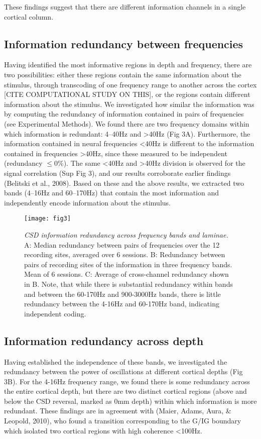 These findings suggest that there are different information channels in a single cortical column.

\subsection{Information redundancy between frequencies}
Having identified the most informative regions in depth and frequency, there are two possibilities: either these regions contain the same information about the stimulus, through transcoding of one frequency range to another across the cortex [CITE COMPUTATIONAL STUDY ON THIS], or the regions contain different information about the stimulus. We investigated how similar the information was by computing the redundancy of information contained in pairs of frequencies (see Experimental Methods). We found there are two frequency domains within which information is redundant: 4--40Hz and {\textgreater}40Hz (Fig 3A). Furthermore, the information contained in neural frequencies {\textless}40Hz is different to the information contained in frequencies {\textgreater}40Hz, since these measured to be independent (redundancy ${\leq}$0\%). The same {\textless}40Hz and {\textgreater}40Hz division is observed for the signal correlation (Sup Fig 3), and our results corroborate earlier findings (Belitski et al., 2008). Based on these and the above results, we extracted two bands (4--16Hz and 60--170Hz) that contain the most information and independently encode information about the stimulus.

\begin{figure}[htbp]
\centering \texttt{[image: fig3]}
%
\caption{%
\textit{CSD information redundancy across frequency bands and laminae.}
A: Median redundancy between pairs of frequencies over the 12 recording 
sites, averaged over 6 sessions.
B: Redundancy between pairs of recording sites of the information in three 
frequency bands. Mean of 6 sessions.
C: Average of cross-channel redundancy shown in B.
Note, that while there is substantial redundancy within bands and between the 
60-170Hz and 900-3000Hz bands, there is little redundancy between the 4-16Hz and
60-170Hz band, indicating independent coding.}%
\label{fig:lam_3}
%
\end{figure}

\subsection{Information redundancy across depth}
Having established the independence of these bands, we investigated the redundancy between the power of oscillations at different cortical depths (Fig 3B). For the 4-16Hz frequency range, we found there is some redundancy across the entire cortical depth, but there are two distinct cortical regions (above and below the CSD reversal, marked as 0mm depth) within which information is more redundant. These findings are in agreement with (Maier, Adams, Aura, \& Leopold, 2010), who found a transition corresponding to the G/IG boundary which isolated two cortical regions with high coherence {\textless}100Hz.

